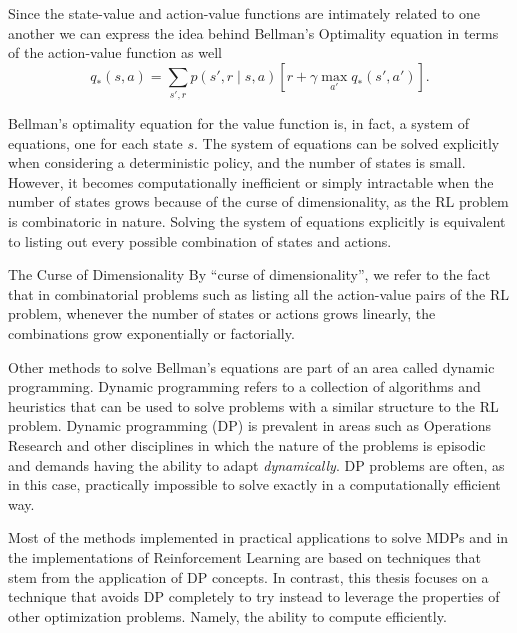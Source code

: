 Since the state-value and action-value functions are intimately related to one
another we can express the idea behind Bellman's Optimality equation in terms of
the action-value function as well
\[
	q_* (s, a) = \sum_{s', r} p(s', r \mid s, a) \left[ r + \gamma \max_{a'} q_{*} (s', a') \right].
\]

Bellman's optimality equation for the value function is, in fact, a system of
equations, one for each state $s$. The system of equations can be solved
explicitly when considering a deterministic policy, and the number of states is
small. However, it becomes computationally inefficient or simply intractable
when the number of states grows because of the curse of dimensionality, as the
RL problem is combinatoric in nature. Solving the system of equations explicitly
is equivalent to listing out every possible combination of states and actions.

\begin{remark}{The Curse of Dimensionality}
	By ``curse of dimensionality'', we refer to the fact that in combinatorial
	problems such as listing all the action-value pairs of the RL problem,
	whenever the number of states or actions grows linearly, the combinations
	grow exponentially or factorially.
\end{remark}

Other methods to solve Bellman's equations are part of an area called dynamic
programming. Dynamic programming refers to a collection of algorithms and
heuristics that can be used to solve problems with a similar structure to the RL
problem. Dynamic programming (DP) is prevalent in areas such as Operations
Research and other disciplines in which the nature of the problems is episodic
and demands having the ability to adapt \textit{dynamically}. DP problems are
often, as in this case, practically impossible to solve exactly in a
computationally efficient way.

Most of the methods implemented in practical applications to solve MDPs and in
the implementations of Reinforcement Learning are based on techniques that stem
from the application of DP concepts. In contrast, this thesis focuses on a
technique that avoids DP completely to try instead to leverage the properties of
other optimization problems. Namely, the ability to compute efficiently.